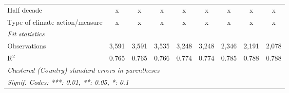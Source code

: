 \begin{tabular}{lcccccccc}
   Half decade                                                             & x              & x              & x              & x              & x              & x              & x              & x\\  
   Type of climate action/measure                                          & x              & x              & x              & x              & x              & x              & x              & x\\  
   \midrule \emph{Fit statistics}\\
   Observations                                                            & 3,591          & 3,591          & 3,535          & 3,248          & 3,248          & 2,346          & 2,191          & 2,078\\  
   R$^2$                                                                   & 0.765          & 0.765          & 0.766          & 0.774          & 0.774          & 0.785          & 0.788          & 0.788\\  
   \midrule
   \multicolumn{9}{l}{\emph{Clustered (Country) standard-errors in parentheses}}\\
   \multicolumn{9}{l}{\emph{Signif. Codes: ***: 0.01, **: 0.05, *: 0.1}}\\
\end{tabular}
\par\endgroup


